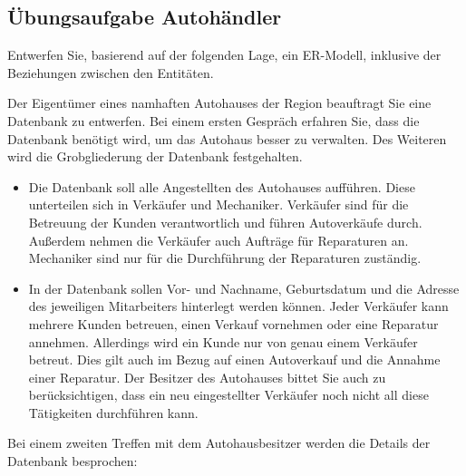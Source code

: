       \subsection{\"Ubungsaufgabe Autoh\"andler}
        Entwerfen Sie, basierend auf der folgenden Lage, ein ER-Modell, inklusive der Beziehungen zwischen
        den Entit\"{a}ten.

        Der Eigent\"umer eines namhaften Autohauses der Region beauftragt Sie eine Datenbank zu entwerfen.
        Bei einem ersten Gespr\"ach erfahren Sie, dass die Datenbank ben\"otigt wird, um das Autohaus besser zu
        verwalten. Des Weiteren wird die Grobgliederung der Datenbank festgehalten.
        \begin{itemize}
          \item Die Datenbank soll alle Angestellten des Autohauses auff\"uhren. Diese unterteilen sich in Verk\"aufer und Mechaniker. Verk\"aufer sind f\"ur die Betreuung der Kunden verantwortlich und f\"uhren  Autoverk\"aufe durch. Au\ss erdem nehmen die Verk\"aufer auch Auftr\"age f\"ur Reparaturen an. Mechaniker sind nur f\"ur die Durchf\"uhrung der Reparaturen zust\"andig.
          \item In der Datenbank sollen Vor- und Nachname, Geburtsdatum und die Adresse des jeweiligen Mitarbeiters
          hinterlegt werden k\"onnen. Jeder Verk\"aufer kann mehrere Kunden betreuen, einen Verkauf vornehmen oder eine Reparatur annehmen. Allerdings wird ein Kunde nur von genau einem Verk\"aufer betreut. Dies gilt auch im Bezug auf einen Autoverkauf und die Annahme einer Reparatur. Der Besitzer des Autohauses bittet Sie auch zu ber\"ucksichtigen, dass ein neu eingestellter Verk\"aufer noch nicht all diese T\"atigkeiten durchf\"uhren kann.
        \end{itemize}
        Bei einem zweiten Treffen mit dem Autohausbesitzer werden die Details der Datenbank besprochen:
